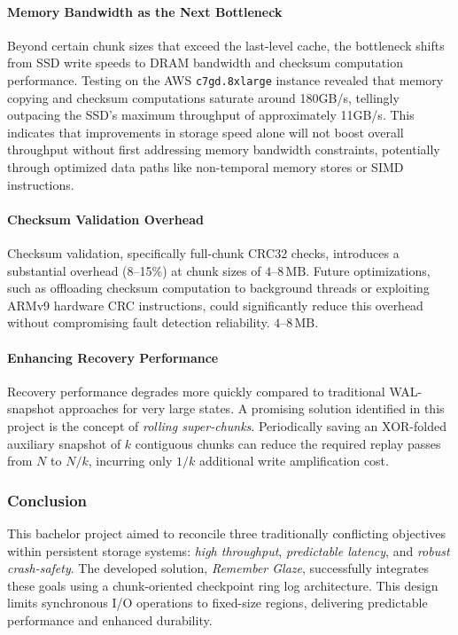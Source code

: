 \documentclass[conference]{IEEEtran}
\begin{document}
\paragraph{Memory Bandwidth as the Next Bottleneck}
Beyond certain chunk sizes that exceed the last-level cache, the bottleneck shifts from SSD write speeds to DRAM bandwidth and checksum computation performance. Testing on the AWS \texttt{c7gd.8xlarge} instance revealed that memory copying and checksum computations saturate around 180GB/s, tellingly outpacing the SSD's maximum throughput of approximately 11GB/s. This indicates that improvements in storage speed alone will not boost overall throughput without first addressing memory bandwidth constraints, potentially through optimized data paths like non-temporal memory stores or SIMD instructions.

\paragraph{Checksum Validation Overhead}
Checksum validation, specifically full-chunk CRC32 checks, introduces a substantial overhead (8–15\%) at chunk sizes of \(4\text{–}8\,\text{MB}\). Future optimizations, such as offloading checksum computation to background threads or exploiting ARMv9 hardware CRC instructions, could significantly reduce this overhead without compromising fault detection reliability.
\(4\text{–}8\,\text{MB}\). 

\paragraph{Enhancing Recovery Performance}
Recovery performance degrades more quickly compared to traditional WAL-snapshot approaches for very large states. A promising solution identified in this project is the concept of \textit{rolling super-chunks}. Periodically saving an XOR-folded auxiliary snapshot of \(k\) contiguous chunks can reduce the required replay passes from \(N\) to \(N/k\), incurring only \(1/k\) additional write amplification cost.

\subsubsection*{Conclusion}
This bachelor project aimed to reconcile three traditionally conflicting objectives within persistent storage systems: \emph{high throughput}, \emph{predictable latency}, and \emph{robust crash-safety}. The developed solution, \textit{Remember Glaze}, successfully integrates these goals using a chunk-oriented checkpoint ring log architecture. This design limits synchronous I/O operations to fixed-size regions, delivering predictable performance and enhanced durability.
\end{document}
